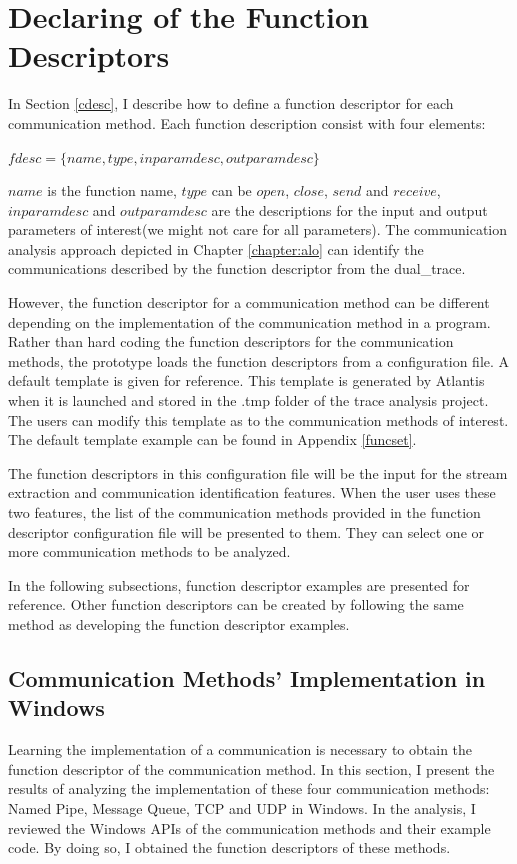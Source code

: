 \section{Declaring of the Function Descriptors}\label{functionset}
In Section \ref{cdesc}, I describe how to define a function descriptor for each communication method. Each function description consist with four elements: 

$fdesc = \lbrace name, type, inparamdesc, outparamdesc \rbrace$

$name$ is the function name, $type$ can be $open$, $close$, $send$ and $receive$, $inparamdesc$ and $outparamdesc$ are the descriptions for the input and output parameters of interest(we might not care for all parameters). The communication analysis approach depicted in Chapter \ref{chapter:alo} can identify the communications described by the function descriptor from the dual\_trace.

However, the function descriptor for a communication method can be different depending on the implementation of the communication method in a program. Rather than hard coding the function descriptors for the communication methods, the prototype loads the function descriptors from a configuration file. A default template is given for reference. This template is generated by Atlantis when it is launched and stored in the .tmp folder of the trace analysis project. The users can modify this template as to the communication methods of interest. The default template example can be found in Appendix \ref{funcset}.

The function descriptors in this configuration file will be the input for the stream extraction and communication identification features. When the user uses these two features, the list of the communication methods provided in the function descriptor configuration file will be presented to them. They can select one or more communication methods to be analyzed. 

In the following subsections, function descriptor examples are presented for reference. Other function descriptors can be created by following the same method as developing the function descriptor examples.

\subsection{Communication Methods' Implementation in Windows}\label{windows}
Learning the implementation of a communication is necessary to obtain the function descriptor of the communication method. In this section, I present the results of analyzing the implementation of these four communication methods: Named Pipe, Message Queue, TCP and UDP in Windows. In the analysis, I reviewed the Windows APIs of the communication methods and their example code. By doing so, I obtained the function descriptors of these methods. 

